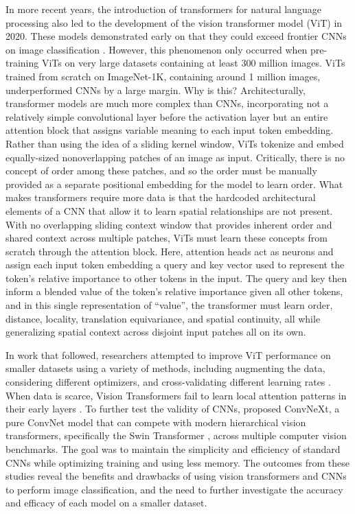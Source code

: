 \documentclass{article}
\begin{document}
In more recent years, the introduction of transformers for natural language processing also led to the development of the vision transformer model (ViT) in 2020. These models demonstrated early on that they could exceed frontier CNNs on image classification \citep{dosovitskiy2021}. However, this phenomenon only occurred when pre-training ViTs on very large datasets containing at least 300 million images. ViTs trained from scratch on ImageNet-1K, containing around 1 million images, underperformed CNNs by a large margin. Why is this? Architecturally, transformer models are much more complex than CNNs, incorporating not a relatively simple convolutional layer before the activation layer but an entire attention block that assigns variable meaning to each input token embedding. Rather than using the idea of a sliding kernel window, ViTs tokenize and embed equally-sized nonoverlapping patches of an image as input. Critically, there is no concept of order among these patches, and so the order must be manually provided as a separate positional embedding for the model to learn order. What makes transformers require more data is that the hardcoded architectural elements of a CNN that allow it to learn spatial relationships are not present. With no overlapping sliding context window that provides inherent order and shared context across multiple patches, ViTs must learn these concepts from scratch through the attention block. Here, attention heads act as neurons and assign each input token embedding a query and key vector used to represent the token's relative importance to other tokens in the input. The query and key then inform a blended value of the token's relative importance given all other tokens, and in this single representation of ``value'', the transformer must learn order, distance, locality, translation equivariance, and spatial continuity, all while generalizing spatial context across disjoint input patches all on its own.

In work that followed, researchers attempted to improve ViT performance on smaller datasets using a variety of methods, including augmenting the data, considering different optimizers, and cross-validating different learning rates \citep{touvron2021, steiner2022}. When data is scarce, Vision Transformers fail to learn local attention patterns in their early layers \citep{raghu2021}. To further test the validity of CNNs, \citet{liu2022} proposed ConvNeXt, a pure ConvNet model that can compete with modern hierarchical vision transformers, specifically the Swin Transformer \citep{liu2021}, across multiple computer vision benchmarks. The goal was to maintain the simplicity and efficiency of standard CNNs while optimizing training and using less memory. The outcomes from these studies reveal the benefits and drawbacks of using vision transformers and CNNs to perform image classification, and the need to further investigate the accuracy and efficacy of each model on a smaller dataset.
\end{document}
